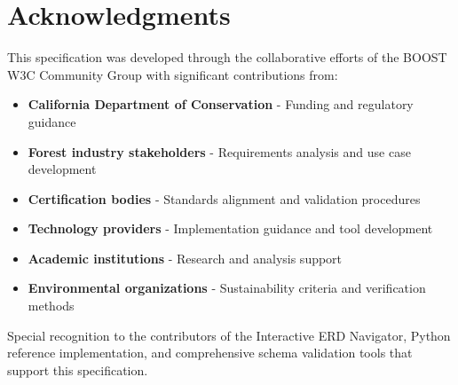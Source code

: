 \documentclass[12pt,a4paper]{article}
\begin{document}
\section*{Acknowledgments}

This specification was developed through the collaborative efforts of the BOOST W3C Community Group with significant contributions from:

\begin{itemize}
    \item \textbf{California Department of Conservation} - Funding and regulatory guidance
    \item \textbf{Forest industry stakeholders} - Requirements analysis and use case development  
    \item \textbf{Certification bodies} - Standards alignment and validation procedures
    \item \textbf{Technology providers} - Implementation guidance and tool development
    \item \textbf{Academic institutions} - Research and analysis support
    \item \textbf{Environmental organizations} - Sustainability criteria and verification methods
\end{itemize}

Special recognition to the contributors of the Interactive ERD Navigator, Python reference implementation, and comprehensive schema validation tools that support this specification.

\newpage
\printindex
\end{document}
